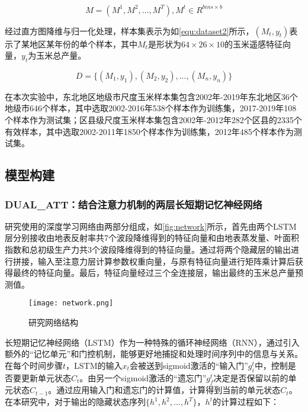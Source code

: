 \begin{equation}
  \label{equ:histogram}
  M=(M^1, M^2, ..., M^T), M^t\in R^{bins\times b}
\end{equation}

\par 经过直方图降维与归一化处理，样本集表示为如\autoref{equ:dataset2}所示，$(M_t, y_t)$表示了某地区某年份的单个样本，其中$M_t$是形状为$64\times 26\times 10$的玉米遥感特征向量，$y_t$为玉米总产量。

\begin{equation}
  \label{equ:dataset2}
  D=\{(M_1, y_1),(M_2, y_2), ..., (M_n, y_n)\}
\end{equation}

\par 在本次实验中，东北地区地级市尺度玉米样本集包含2002年-2019年东北地区36个地级市646个样本，其中选取2002-2016年538个样本作为训练集，2017-2019年108个样本作为测试集；区县级尺度玉米样本集包含2002年-2012年282个区县的2335个有效样本，其中选取2002-2011年1850个样本作为训练集，2012年485个样本作为测试集。

\subsection{模型构建}
\subsubsection{DUAL\_ATT：结合注意力机制的两层长短期记忆神经网络}

\par 研究使用的深度学习网络由两部分组成，如\autoref{fig:network}所示，首先由两个LSTM层分别接收由地表反射率共7个波段降维得到的特征向量和由地表蒸发量、叶面积指数和总初级生产力共3个波段降维得到的特征向量。通过将两个隐藏层的输出进行拼接，输入至注意力层计算参数权重向量，与原有特征向量进行矩阵乘计算后获得最终的特征向量。最后，特征向量经过三个全连接层，输出最终的玉米总产量预测值。

\begin{figure}[ht]
  \centering
  \texttt{[image: network.png]}
  \caption{\label{fig:network}研究网络结构}
\end{figure}

\par 长短期记忆神经网络（LSTM）作为一种特殊的循环神经网络（RNN），通过引入额外的“记忆单元”和门控机制，能够更好地捕捉和处理时间序列中的信息与关系\cite{LI2019104785}。在每个时间步骤$t$，LSTM的输入$x_t$会被送到sigmoid激活的“输入门”$g_i^t$中，控制是否要更新单元状态$C_t$。由另一个sigmoid激活的“遗忘门”$g_f^t$决定是否保留以前的单元状态$C_{t-1}$。通过应用输入门和遗忘门的计算值，计算得到当前的单元状态$C_t$。在本研究中，对于输出的隐藏状态序列$\{h^1, h^2, ..., h^T\}$，$h^t$的计算过程如下：

